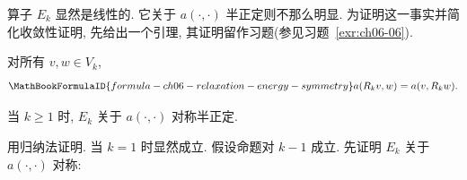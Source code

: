 算子 $E_k$ 显然是线性的. 它关于 $a(\cdot,\cdot)$ 半正定则不那么明显. 为证明这一事实并简化收敛性证明, 先给出一个引理, 其证明留作习题(参见习题~\ref{exr:ch06-06}).

\begin{Lemma}
\label{lem:ch06-relaxation-energy-symmetry}
对所有 $v,w\in V_k$,
\[
\MathBookFormulaID{formula-ch06-relaxation-energy-symmetry}
a(R_kv,w)=a(v,R_kw).
\]
\end{Lemma}

\begin{Proposition}
\label{prop:ch06-error-operator-positive-semidefinite}
当 $k\geq1$ 时, $E_k$ 关于 $a(\cdot,\cdot)$ 对称半正定.
\end{Proposition}
\begin{Proof}
用归纳法证明. 当 $k=1$ 时显然成立. 假设命题对 $k-1$ 成立. 先证明 $E_k$ 关于 $a(\cdot,\cdot)$ 对称:


\end{Proof}

